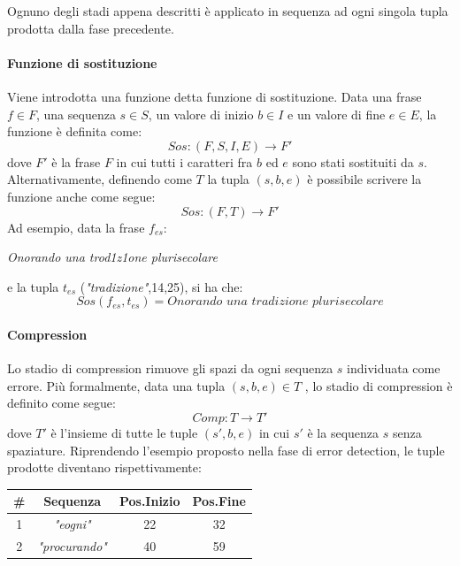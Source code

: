 Ognuno degli stadi appena descritti è applicato in sequenza ad ogni singola tupla prodotta dalla fase precedente.

\paragraph{Funzione di sostituzione}
Viene introdotta una funzione detta funzione di sostituzione. Data una frase $f \in F$, una sequenza $s \in S$, un valore di inizio $b \in I$ e un valore di fine $e \in E$, la funzione è definita come:
\begin{equation}
\textit{Sos}: (F,S,I,E) \rightarrow F\prime
\end{equation}
dove $F\prime$ è la frase $F$ in cui tutti i caratteri fra $b$ ed $e$ sono stati sostituiti da $s$.\\
Alternativamente, definendo come $T$ la tupla $(s,b,e)$ è possibile scrivere la funzione anche come segue:
\begin{equation}
\textit{Sos}: (F,T) \rightarrow F\prime
\end{equation}
Ad esempio, data la frase $f_{es}$:
\begin{center}
\textit{Onorando una trod1z1one plurisecolare}
\end{center}
e la tupla $t_{es}$ (\textit{"tradizione"},14,25), si ha che:
\begin{equation}
\textit{Sos}(f_{es},t_{es}) = \textit{Onorando una tradizione plurisecolare}
\end{equation}


\paragraph{Compression}
Lo stadio di compression rimuove gli spazi da ogni sequenza $s$ individuata come errore. Più formalmente, data una tupla $(s,b,e) \in T$ , lo stadio di compression è definito come segue:
\begin{equation}
\textit{Comp}: T \rightarrow T\prime
\end{equation}
dove $T\prime$ è l'insieme di tutte le tuple $(s\prime,b,e)$ in cui $s\prime$ è la sequenza $s$ senza spaziature. Riprendendo l'esempio proposto nella fase di error detection, le tuple prodotte diventano rispettivamente:
\begin{table}[H]
\centering
\begin{tabular}{cccc}
\#&\textbf{Sequenza} & \textbf{Pos.Inizio} & \textbf{Pos.Fine}\\ \hline
1&\textit{"eogni"}&22& 32\\
2&\textit{"procurando"}& 40& 59\\
\end{tabular}
\end{table}


